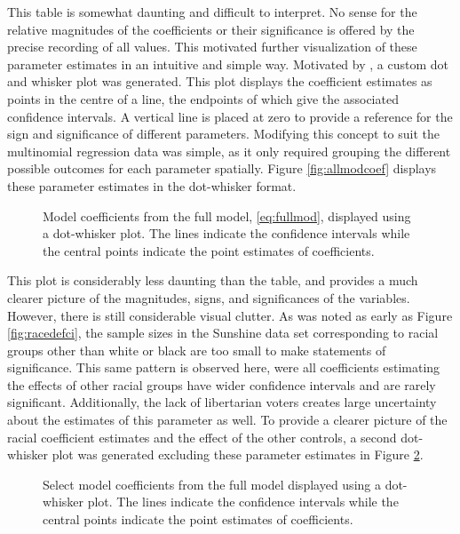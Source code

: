 This table is somewhat daunting and difficult to interpret. No sense for the relative magnitudes of the coefficients or their
significance is offered by the precise recording of all values. This motivated further visualization of these parameter estimates
in an intuitive and simple way. Motivated by \cite{dotwhisker}, a custom dot and whisker plot was generated. This plot displays
the coefficient estimates as points in the centre of a line, the endpoints of which give the associated confidence intervals. A
vertical line is placed at zero to provide a reference for the sign and significance of different parameters. Modifying this
concept to suit the multinomial regression data was simple, as it only required grouping the different possible outcomes for each
parameter spatially. Figure \ref{fig:allmodcoef} displays these parameter estimates in the dot-whisker format.

\begin{figure}[h!]
  \centering
  \caption[All Model Coefficients]{\footnotesize Model coefficients from the full model, \ref{eq:fullmod}, displayed using
    a dot-whisker plot. The lines indicate the confidence intervals while the central points indicate the point estimates of
    coefficients.}
  \label{fig:modallcoef}
\end{figure}

This plot is considerably less daunting than the table, and provides a much clearer picture of the magnitudes, signs, and
significances of the variables. However, there is still considerable visual clutter. As was noted as early as Figure
\ref{fig:racedefci}, the sample sizes in the Sunshine data set corresponding to racial groups other than white or black are too
small to make statements of significance. This same pattern is observed here, were all coefficients estimating the effects of
other racial groups have wider confidence intervals and are rarely significant. Additionally, the lack of libertarian voters
creates large uncertainty about the estimates of this parameter as well. To provide a clearer picture of the racial coefficient
estimates and the effect of the other controls, a second dot-whisker plot was generated excluding these parameter estimates in
Figure \ref{fig:modselcoef}.

\begin{figure}[h!]
  \centering
  \caption[Select Model Coefficients]{\footnotesize Select model coefficients from the full model displayed using a dot-whisker
    plot. The lines indicate the confidence intervals while the central points indicate the point estimates of coefficients.}
  \label{fig:modselcoef}
\end{figure}

